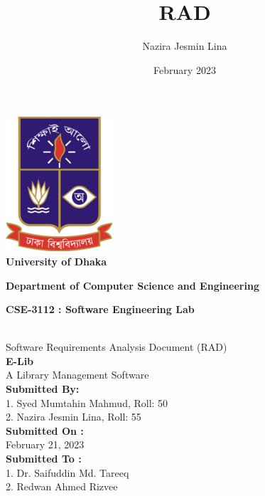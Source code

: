 \documentclass[a4paper,11pt,oneside]{book}
\title{RAD}
\author{Nazira Jesmin Lina }
\date{February 2023}
\begin{document}
\begin{titlepage}
    \begin{center}
        \includegraphics[scale=0.9]{DU-log.png} \\[12pt]
        
        \huge \textbf{University of Dhaka}
        \begin{center}
           { \LARGE \textbf{Department of Computer Science and Engineering \\[8pt]}}
           
             {\textbf{ \LARGE CSE-3112 : Software Engineering Lab \\}}
             \begin{LARGE}
                    \textbf{ \LARGE \\[1pt]}
               Software Requirements Analysis Document (RAD) \\[8pt]
                     \textbf{\Huge E-Lib} \\[8pt]
                     A Library Management Software\\[8pt]    
        		\textbf{Submitted By:\\[8pt]}
        			1. Syed Mumtahin Mahmud, Roll: 50\\[8pt]
                        2. Nazira Jesmin Lina, Roll: 55\\[8pt]

        		\textbf{Submitted On : \\[8pt]}
        			February 21, 2023\\[10pt]
        		\textbf{Submitted To :\\[8pt]}
        			1. Dr. Saifuddin Md. Tareeq \\[8pt]
                    2. Redwan Ahmed Rizvee \\[8pt]
	       \end{LARGE}
             
        \end{center}
    \end{center}
\end{titlepage}

\tableofcontents
\listoffigures





\end{document}
